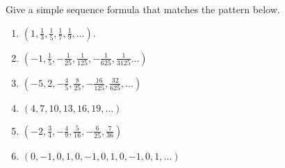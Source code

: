 Give a simple sequence formula that matches the pattern below. 

\begin{multicols}{2}
\begin{enumerate}
\item $\displaystyle \left(1, \frac{1}{3}, \frac{1}{5}, \frac{1}{7},\frac{1}{9},\dots \right)$.

\item $\displaystyle \left(-1, \frac{1}{5}, -\frac{1}{25}, \frac{1}{125},-\frac{1}{625}, \frac{1}{3125}\dots \right)$

\item $\displaystyle \left(-5, 2, -\frac{4}{5}, \frac{8}{25}, -\frac{16}{125}, \frac{32}{625},\dots \right)$


\item $\displaystyle \left(4, 7, 10, 13, 16, 19,\dots\right)$


\item $\left(-2, \frac{3}{4}, -\frac{4}{9}, \frac{5}{16}, -\frac{6}{25}, \frac{7}{36}\right)$


\item $\left(0,-1, 0, 1,0,-1, 0, 1,0,-1, 0, 1,\dots \right)$

\end{enumerate}
\end{multicols}